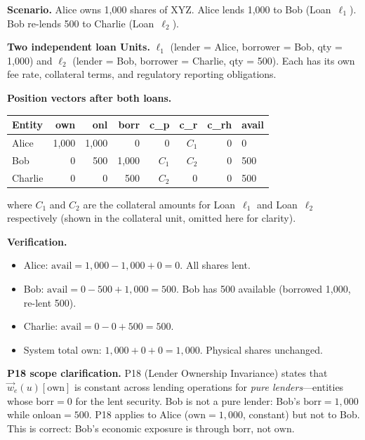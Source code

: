 \documentclass[11pt,a4paper]{article}
\begin{document}
\medskip
\noindent\textbf{Scenario.} Alice owns 1{,}000 shares of XYZ. Alice lends 1{,}000 to Bob (Loan~$\ell_1$). Bob re-lends 500 to Charlie (Loan~$\ell_2$).

\medskip
\noindent\textbf{Two independent loan Units.} $\ell_1$ (lender = Alice, borrower = Bob, qty = 1{,}000) and $\ell_2$ (lender = Bob, borrower = Charlie, qty = 500). Each has its own fee rate, collateral terms, and regulatory reporting obligations.

\medskip
\noindent\textbf{Position vectors after both loans.}

\begin{center}\small
\begin{tabular}{l r r r r r r l}
\toprule
\textbf{Entity} & own & onl & borr & c\_p & c\_r & c\_rh & avail \\
\midrule
Alice & 1{,}000 & 1{,}000 & 0 & 0 & $C_1$ & 0 & 0 \\
Bob & 0 & 500 & 1{,}000 & $C_1$ & $C_2$ & 0 & 500 \\
Charlie & 0 & 0 & 500 & $C_2$ & 0 & 0 & 500 \\
\bottomrule
\end{tabular}
\end{center}

\noindent where $C_1$ and $C_2$ are the collateral amounts for Loan~$\ell_1$ and Loan~$\ell_2$ respectively (shown in the collateral unit, omitted here for clarity).

\medskip
\noindent\textbf{Verification.}
\begin{itemize}[nosep]
\item Alice: $\mathrm{avail} = 1{,}000 - 1{,}000 + 0 = 0$. All shares lent. \checkmark
\item Bob: $\mathrm{avail} = 0 - 500 + 1{,}000 = 500$. Bob has 500 available (borrowed 1{,}000, re-lent 500). \checkmark
\item Charlie: $\mathrm{avail} = 0 - 0 + 500 = 500$. \checkmark
\item System total $\mathrm{own}$: $1{,}000 + 0 + 0 = 1{,}000$. Physical shares unchanged. \checkmark
\end{itemize}

\medskip
\noindent\textbf{P18 scope clarification.} P18 (Lender Ownership Invariance) states that $\vec{w}_e(u)[\mathrm{own}]$ is constant across lending operations for \emph{pure lenders}---entities whose $\mathrm{borr} = 0$ for the lent security. Bob is not a pure lender: Bob's $\mathrm{borr} = 1{,}000$ while $\mathrm{onloan} = 500$. P18 applies to Alice ($\mathrm{own} = 1{,}000$, constant) but not to Bob. This is correct: Bob's economic exposure is through $\mathrm{borr}$, not $\mathrm{own}$.
\end{document}
